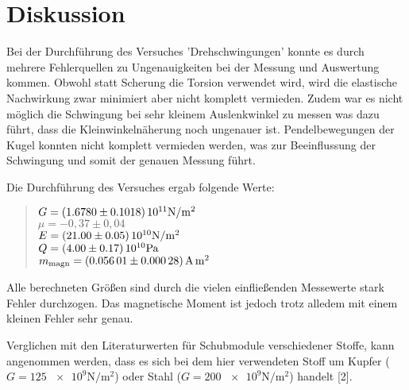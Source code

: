 \section{Diskussion}

Bei der Durchführung des Versuches 'Drehschwingungen' konnte es durch mehrere Fehlerquellen zu Ungenauigkeiten bei der Messung und Auswertung kommen. Obwohl statt Scherung die Torsion verwendet wird, wird die elastische Nachwirkung zwar minimiert aber nicht komplett vermieden. Zudem war es nicht möglich die Schwingung bei sehr kleinem Auslenkwinkel zu messen was dazu führt, dass die Kleinwinkelnäherung noch ungenauer ist. Pendelbewegungen der Kugel konnten nicht komplett vermieden werden, was zur Beeinflussung der Schwingung und somit der genauen Messung führt. 

Die Durchführung des Versuches ergab folgende Werte:
\begin{quote} 
$G = \SI{1.678\pm0.1018}{\num{e11}\newton\per\square\metre}$  \\
$\mu = -0,37 \pm 0,04$ \\
$E = \SI{21.00\pm0.05}{\num{e10}\newton\per\square\metre}$ \\
$Q = \SI{4.00\pm0.17}{\num{e10}\pascal}$ \\
$m_\text{magn} = \SI{0.05601\pm0.00028}{\ampere\square\metre}$
\end{quote} 

Alle berechneten Größen sind durch die vielen einfließenden Messewerte stark Fehler durchzogen.
Das magnetische Moment ist jedoch trotz alledem mit einem kleinen Fehler sehr genau.

Verglichen mit den Literaturwerten für Schubmodule verschiedener Stoffe, kann angenommen werden, dass es sich bei dem hier verwendeten Stoff um Kupfer ($G = \SI{125}{\num{e9}\newton\per\square\metre}$) oder Stahl ($G = \SI{200}{\num{e9}\newton\per\square\metre}$) handelt [2].